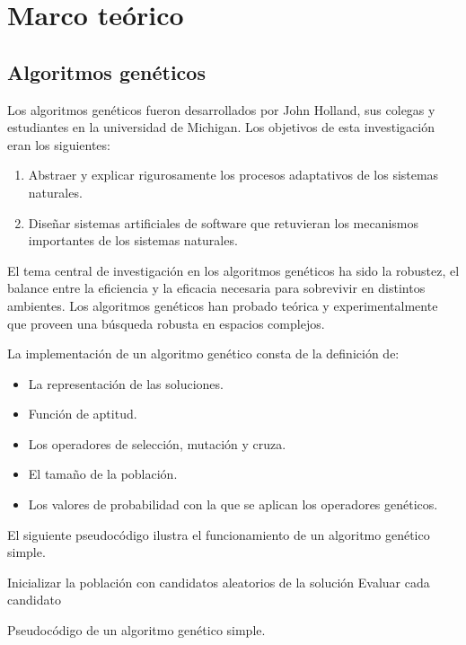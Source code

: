\chapter{Marco teórico}


\section{Algoritmos genéticos}

Los algoritmos genéticos fueron desarrollados por John Holland, sus colegas y estudiantes en la universidad de Michigan. Los objetivos de esta investigación eran los siguientes:
\begin{enumerate}
	\item Abstraer y explicar rigurosamente los procesos adaptativos de los sistemas naturales.
	\item Diseñar sistemas artificiales de software que retuvieran los mecanismos importantes de los sistemas naturales.
\end{enumerate}

El tema central de investigación en los algoritmos genéticos ha sido la robustez, el balance entre la eficiencia y la eficacia necesaria para sobrevivir en distintos ambientes. Los algoritmos genéticos han probado teórica y experimentalmente que proveen una búsqueda robusta en espacios complejos.

La implementación de un algoritmo genético consta de la definición de:

\begin{itemize}
	\item La representación de las soluciones.
	\item Función de aptitud.
	\item Los operadores de selección, mutación y cruza.
	\item El tamaño de la población.
	\item Los valores de probabilidad con la que se aplican los operadores genéticos.
\end{itemize}

El siguiente pseudocódigo ilustra el funcionamiento de un algoritmo genético simple.

\begin{algorithm}[h] 
	
	\SetAlgoLined
	Inicializar la población con candidatos aleatorios de la solución\;
	Evaluar cada candidato\;
	
	\caption{Pseudocódigo de un algoritmo genético simple.}
\end{algorithm}

